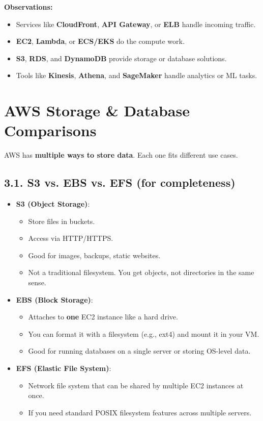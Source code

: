 \documentclass[12pt]{article}
\begin{document}
\noindent
\textbf{Observations:}
\begin{itemize}
    \item Services like \textbf{CloudFront}, \textbf{API Gateway}, or \textbf{ELB} handle incoming traffic.
    \item \textbf{EC2}, \textbf{Lambda}, or \textbf{ECS/EKS} do the compute work.
    \item \textbf{S3}, \textbf{RDS}, and \textbf{DynamoDB} provide storage or database solutions.
    \item Tools like \textbf{Kinesis}, \textbf{Athena}, and \textbf{SageMaker} handle analytics or ML tasks.
\end{itemize}

\clearpage

\section{AWS Storage \& Database Comparisons}

AWS has \textbf{multiple ways to store data}. Each one fits different use cases.

\subsection*{3.1. S3 vs. EBS vs. EFS (for completeness)}
\begin{itemize}
    \item \textbf{S3 (Object Storage)}:
          \begin{itemize}
              \item Store files in buckets.
              \item Access via HTTP/HTTPS.
              \item Good for images, backups, static websites.
              \item Not a traditional filesystem. You get objects, not directories in the same sense.
          \end{itemize}
    \item \textbf{EBS (Block Storage)}:
          \begin{itemize}
              \item Attaches to \textbf{one} EC2 instance like a hard drive.
              \item You can format it with a filesystem (e.g., ext4) and mount it in your VM.
              \item Good for running databases on a single server or storing OS-level data.
          \end{itemize}
    \item \textbf{EFS (Elastic File System)}:
          \begin{itemize}
              \item Network file system that can be shared by multiple EC2 instances at once.
              \item If you need standard POSIX filesystem features across multiple servers.
          \end{itemize}
\end{itemize}
\end{document}
